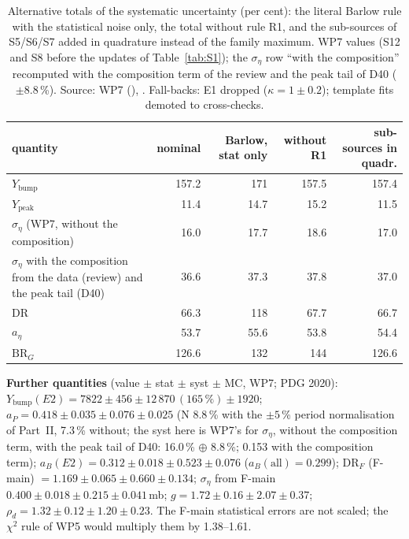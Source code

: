 \documentclass[11pt,a4paper]{article}
\newcommand{\code}[1]{\texttt{\detokenize{#1}}}
\newcommand{\aEta}{\ensuremath{a_\eta}\xspace}
\newcommand{\aP}{\ensuremath{a_P}\xspace}
\newcommand{\Ybump}{\ensuremath{Y_{\mathrm{bump}}}\xspace}
\newcommand{\Ypeak}{\ensuremath{Y_{\mathrm{peak}}}\xspace}
\newcommand{\rhod}{\ensuremath{\rho_d}\xspace}
\newcommand{\BRG}{\ensuremath{\mathrm{BR}_G}\xspace}
\begin{document}
\begin{table}[H]
\centering
\caption{Alternative totals of the systematic uncertainty (per cent): the literal Barlow rule with the statistical noise only, the total
without rule R1, and the sub-sources of S5/S6/S7 added in quadrature instead of the family maximum. WP7 values (S12 and S8 before the
updates of Table~\ref{tab:S1}); the $\sigma_\eta$ row ``with the composition'' recomputed with the composition term of the review and the
peak tail of D40 ($\pm8.8$\,\%). Source: WP7 (\code{syst.txt}),
\code{fix_numbers.txt}. Fall-backs: E1 dropped ($\kappa=1\pm0.2$); template fits demoted to cross-checks.}
\label{tab:alttot}
\small
\begin{tabular}{@{}>{\raggedright\arraybackslash}p{5.2cm} r r r r@{}}
\toprule
quantity & nominal & Barlow, stat only & without R1 & sub-sources in quadr. \\
\midrule
\Ybump & 157.2 & 171 & 157.5 & 157.4 \\
\Ypeak & 11.4 & 14.7 & 15.2 & 11.5 \\
$\sigma_\eta$ (WP7, without the composition) & 16.0 & 17.7 & 18.6 & 17.0 \\
$\sigma_\eta$ with the composition from the data (review) and the peak tail (D40) & 36.6 & 37.3 & 37.8 & 37.0 \\
DR & 66.3 & 118 & 67.7 & 66.7 \\
\aEta & 53.7 & 55.6 & 53.8 & 54.4 \\
\BRG & 126.6 & 132 & 144 & 126.6 \\
\bottomrule
\end{tabular}
\end{table}

\textbf{Further quantities} (value $\pm$ stat $\pm$ syst $\pm$ MC, WP7; PDG 2020): $\Ybump(E2)=7822\pm456\pm12\,870\,(165\,\%)\pm1920$;
$\aP=0.418\pm0.035\pm0.076\pm0.025$ (N 8.8\,\% with the $\pm5$\,\% period normalisation of Part~II, 7.3\,\% without; the syst here is WP7's
for $\sigma_\eta$, without the composition term, with the peak tail of D40: 16.0\,\% $\oplus$ 8.8\,\%; 0.153 with the composition term); $a_B(E2)=0.312\pm0.018\pm0.523\pm0.076$
($a_B(\mathrm{all})=0.299$); DR$_F$ (F-main) $=1.169\pm0.065\pm0.660\pm0.134$;
$\sigma_\eta$ from F-main $0.400\pm0.018\pm0.215\pm0.041$\,mb; $g=1.72\pm0.16\pm2.07\pm0.37$; $\rhod=1.32\pm0.12\pm1.20\pm0.23$. The F-main
statistical errors are not scaled; the $\chi^2$ rule of WP5 would multiply them by 1.38--1.61.
\end{document}
